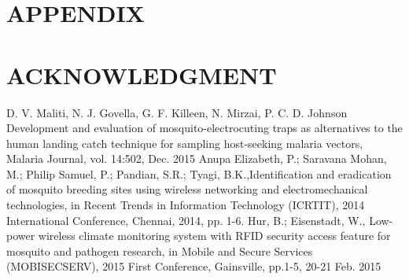 \documentclass[letterpaper, 10 pt, conference]{ieeeconf}  %
\begin{document}



\section*{APPENDIX}



\section*{ACKNOWLEDGMENT}








\begin{thebibliography}{99}

 D. V. Maliti, N. J. Govella, G. F. Killeen, N. Mirzai, P. C. D. Johnson Development and evaluation of mosquito-electrocuting traps as alternatives to the human landing catch technique for sampling host-seeking malaria vectors, Malaria Journal, vol. 14:502, Dec. 2015
 Anupa Elizabeth, P.; Saravana Mohan, M.; Philip Samuel, P.; Pandian, S.R.; Tyagi, B.K.,Identification and eradication of mosquito breeding sites using wireless networking and electromechanical technologies, in Recent Trends in Information Technology (ICRTIT), 2014 International Conference, Chennai, 2014, pp. 1-6.
 Hur, B.; Eisenstadt, W., Low-power wireless climate monitoring system with RFID security access feature for mosquito and pathogen research, in Mobile and Secure Services (MOBISECSERV), 2015 First Conference, Gainsville, pp.1-5, 20-21 Feb. 2015





\end{thebibliography}
\end{document}
